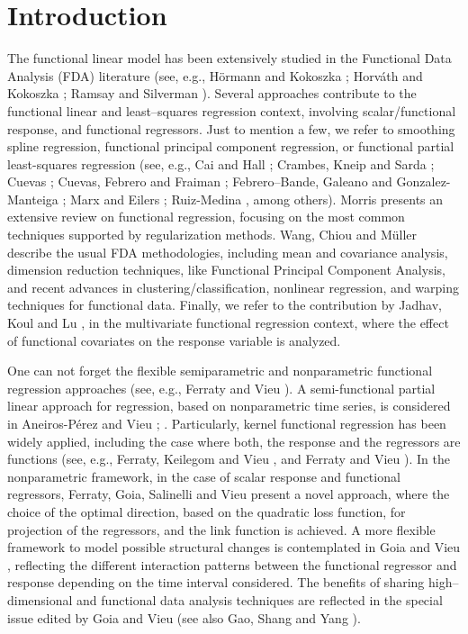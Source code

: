 \documentclass[11pt,a4paper]{article}
\begin{document}
\section{Introduction}
\label{intro} The functional linear model has been extensively studied in the Functional Data Analysis (FDA) literature (see, e.g., H\"{o}rmann and Kokoszka \cite{HormannKokoszka10};
 Horv\'ath and Kokoszka \cite{HorvathKokoszka12}; Ramsay  and Silverman \cite{RamsaySilverman05}).
Several approaches contribute to the functional linear and least--squares regression context, involving scalar/functional response, and functional regressors. Just to mention a few, we refer to  smoothing spline regression,  functional principal
component regression, or functional partial least-squares regression
  (see, e.g., Cai and  Hall \cite{CaiHall06}; Crambes, Kneip and  Sarda \cite{Crambes09};
 Cuevas \cite{Cuevas14};
 Cuevas,   Febrero and   Fraiman \cite{Cuevasetal02};
 Febrero--Bande,   Galeano  and Gonzalez-Manteiga  \cite{FebreroBande15};  Marx and  Eilers
\cite{MarxEilers99};   Ruiz-Medina \cite{RuizMedina16},
  among others).
 Morris \cite{Morris15} presents an extensive review on functional regression,  focusing on the most common techniques supported by regularization methods. Wang, Chiou and M\"uller \cite{Wangetal16}  describe  the usual  FDA methodologies, including  mean and covariance analysis,  dimension reduction techniques, like Functional Principal Component Analysis,  and  recent advances in clustering/classification,  nonlinear regression, and warping techniques for functional data.  Finally, we refer to the contribution by Jadhav, Koul and Lu \cite{Jadhavetal17}, in the multivariate functional regression context, where the effect of functional covariates on the response variable is analyzed.

One can not forget the flexible  semiparametric and nonparametric functional regression approaches (see, e.g., Ferraty and Vieu
\cite{FerratyVieu06}).
A semi-functional partial linear approach
for regression, based on nonparametric time series, is considered in
Aneiros-P\'erez  and Vieu \cite{Aneiros06};  \cite{Aneiros08}.  Particularly, kernel functional regression has been widely applied, including the case where both,  the  response and the regressors are functions   (see, e.g., Ferraty,   Keilegom  and Vieu \cite{FerratyVieu12}, and   Ferraty and Vieu  \cite{Ferraty11}). In the nonparametric framework, in the case of scalar response and functional regressors,    Ferraty, Goia, Salinelli and Vieu \cite{Ferratyetal13} present  a novel approach,  where the   choice of the optimal direction,  based on the  quadratic loss function, for projection of the regressors, and  the  link function  is achieved. A more flexible framework to model possible structural changes is contemplated in
 Goia and Vieu \cite{GoiaVieu15}, reflecting the different interaction patterns between the functional regressor and response depending on the time interval considered. The benefits of sharing  high--dimensional and functional data analysis techniques  are reflected in the special issue edited by Goia and Vieu \cite{GoiaVieu16} (see  also Gao,  Shang  and Yang \cite{Gaoetal19}).
\end{document}
